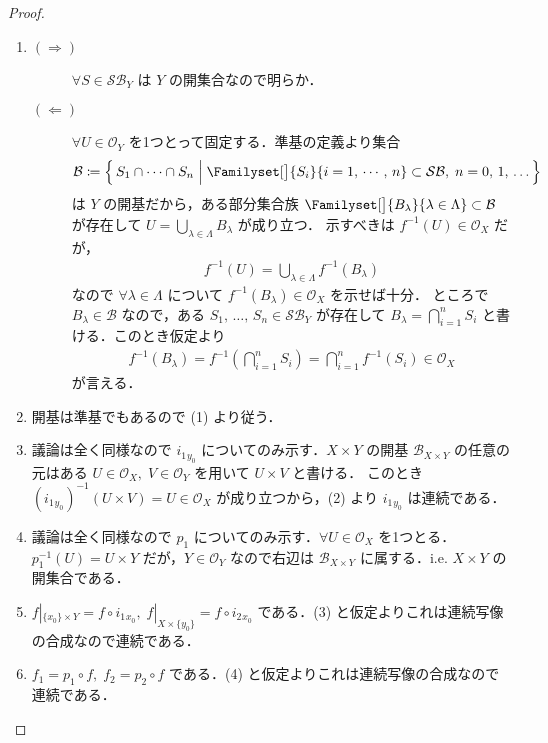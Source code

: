 \documentclass[algtopo_main]{subfiles}
\begin{document}
\begin{proof}
    \begin{enumerate}
        \item 
        \begin{description}
            \item[\textbf{$\bm{(\Longrightarrow)}$}] $\forall S \in \mathcal{SB}_Y$ は $Y$ の開集合なので明らか．
            \item[\textbf{$\bm{(\Longleftarrow)}$}] $\forall U \in \mathscr{O}_Y$ を1つとって固定する．準基の定義より集合
            \begin{align}
                \mathcal{B} \coloneqq \Bigl\{\, S_1 \cap \cdots \cap S_n \Bigm| \Familyset[\big]{S_i}{i = 1,\, \cdots,\, n} \subset \mathcal{SB},\; n=0,\, 1,\, \dots \,\Bigr\}
            \end{align}
            は $Y$ の開基だから，ある部分集合族 $\Familyset[\big]{B_\lambda}{\lambda \in \Lambda} \subset \mathcal{B}$ が存在して $U = \bigcup_{\lambda \in \Lambda} B_\lambda$ が成り立つ．
            示すべきは $f^{-1}(U) \in \mathscr{O}_X$ だが，
            \begin{align}
                f^{-1}(U) = \bigcup_{\lambda \in \Lambda} f^{-1}(B_\lambda)
            \end{align}
            なので $\forall \lambda \in \Lambda$ について $f^{-1} (B_\lambda) \in \mathscr{O}_X$ を示せば十分．
            ところで $B_\lambda \in \mathscr{B}$ なので，ある $S_1,\, \dots ,\, S_n \in \mathcal{SB}_Y$ が存在して $B_\lambda = \bigcap_{i=1}^n S_i$ と書ける．このとき仮定より
            \begin{align}
                f^{-1}(B_\lambda) = f^{-1}\left( \bigcap_{i=1}^n S_i \right)  = \bigcap_{i=1}^n f^{-1}(S_i) \in \mathscr{O}_X
            \end{align}
            が言える．
        \end{description}
        \item 開基は準基でもあるので (1) より従う．
        \item 議論は全く同様なので $i_1{}_{y_0}$ についてのみ示す．$X \times Y$ の開基 $\mathcal{B}_{X \times Y}$ の任意の元はある $U \in \mathscr{O}_X,\; V \in \mathscr{O}_Y$ を用いて $U \times V$ と書ける．
        このとき $(i_1{}_{y_0})^{-1}(U \times V) = U \in \mathscr{O}_X$ が成り立つから，(2) より $i_1{}_{y_0}$ は連続である．
        \item 議論は全く同様なので $p_1$ についてのみ示す．$\forall U \in \mathscr{O}_X$ を1つとる．$p_1^{-1}(U) = U \times Y$ だが，$Y \in \mathscr{O}_Y$ なので右辺は $\mathcal{B}_{X \times Y}$ に属する．i.e. $X \times Y$ の開集合である．
        \item $f|_{\{x_0\} \times Y} = f \circ i_1{}_{x_0},\; f|_{X \times \{y_0\}} = f \circ i_2{}_{x_0}$ である．(3) と仮定よりこれは連続写像の合成なので連続である．
        \item $f_1 = p_1 \circ f,\; f_2 = p_2 \circ f$ である．(4) と仮定よりこれは連続写像の合成なので連続である．
    \end{enumerate}
\end{proof}
\end{document}

